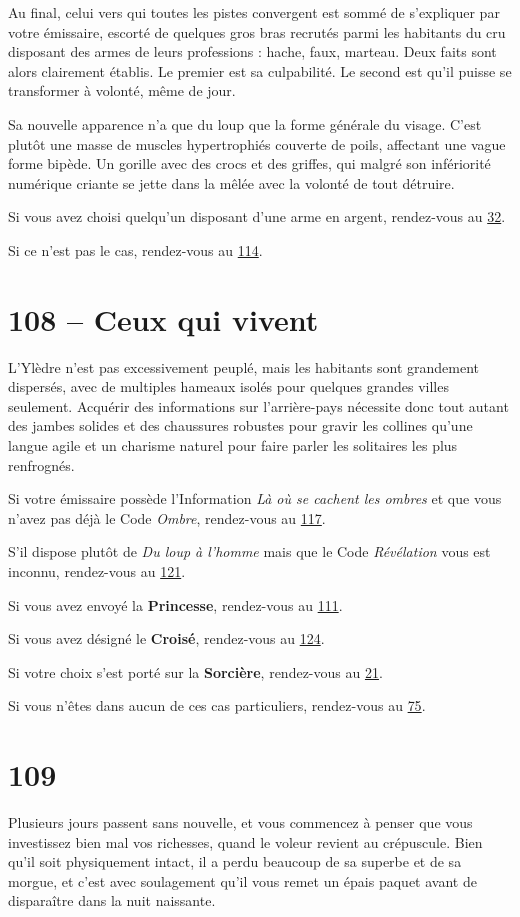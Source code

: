 \documentclass{report}
\newcommand{\gsection}[1]{
    \section{#1}
    \label{section-#1}
}
\newcommand{\glink}[1]{\hyperref[section-#1]{#1}}
\newcommand{\hero}[1]{\textbf{#1}}
\begin{document}
Au final, celui vers qui toutes les pistes convergent est sommé de s'expliquer par votre émissaire, escorté de quelques gros bras recrutés parmi les habitants du cru disposant des armes de leurs professions : hache, faux, marteau. Deux faits sont alors clairement établis. Le premier est sa culpabilité. Le second est qu'il puisse se transformer à volonté, même de jour.

Sa nouvelle apparence n'a que du loup que la forme générale du visage. C'est plutôt une masse de muscles hypertrophiés couverte de poils, affectant une vague forme bipède. Un gorille avec des crocs et des griffes, qui malgré son infériorité numérique criante se jette dans la mêlée avec la volonté de tout détruire.

Si vous avez choisi quelqu'un disposant d'une arme en argent, rendez-vous au \glink{32}.

Si ce n'est pas le cas, rendez-vous au \glink{114}.

\gsection{108 – Ceux qui vivent}

L'Ylèdre n'est pas excessivement peuplé, mais les habitants sont grandement dispersés, avec de multiples hameaux isolés pour quelques grandes villes seulement. Acquérir des informations sur l'arrière-pays nécessite donc tout autant des jambes solides et des chaussures robustes pour gravir les collines qu'une langue agile et un charisme naturel pour faire parler les solitaires les plus renfrognés.

Si votre émissaire possède l'Information \emph{Là où se cachent les ombres} et que vous n'avez pas déjà le Code \emph{Ombre}, rendez-vous au \glink{117}.

S'il dispose plutôt de \emph{Du loup à l'homme} mais que le Code \emph{Révélation} vous est inconnu, rendez-vous au \glink{121}.

Si vous avez envoyé la \hero{Princesse}, rendez-vous au \glink{111}.

Si vous avez désigné le \hero{Croisé}, rendez-vous au \glink{124}.

Si votre choix s'est porté sur la \hero{Sorcière}, rendez-vous au \glink{21}.

Si vous n'êtes dans aucun de ces cas particuliers, rendez-vous au \glink{75}.

\gsection{109}

Plusieurs jours passent sans nouvelle, et vous commencez à penser que vous investissez bien mal vos richesses, quand le voleur revient au crépuscule. Bien qu'il soit physiquement intact, il a perdu beaucoup de sa superbe et de sa morgue, et c'est avec soulagement qu'il vous remet un épais paquet avant de disparaître dans la nuit naissante.
\end{document}
